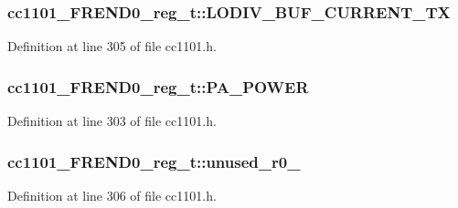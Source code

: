 \subsubsection[{\texorpdfstring{L\+O\+D\+I\+V\+\_\+\+B\+U\+F\+\_\+\+C\+U\+R\+R\+E\+N\+T\+\_\+\+TX}{LODIV_BUF_CURRENT_TX}}]{ cc1101\+\_\+\+F\+R\+E\+N\+D0\+\_\+reg\+\_\+t\+::\+L\+O\+D\+I\+V\+\_\+\+B\+U\+F\+\_\+\+C\+U\+R\+R\+E\+N\+T\+\_\+\+TX}\hypertarget{structcc1101___f_r_e_n_d0__reg__t_a6461f77120fbe314b6b185bc4e121732}{}\label{structcc1101___f_r_e_n_d0__reg__t_a6461f77120fbe314b6b185bc4e121732}


Definition at line 305 of file cc1101.\+h.

\subsubsection[{\texorpdfstring{P\+A\+\_\+\+P\+O\+W\+ER}{PA_POWER}}]{ cc1101\+\_\+\+F\+R\+E\+N\+D0\+\_\+reg\+\_\+t\+::\+P\+A\+\_\+\+P\+O\+W\+ER}\hypertarget{structcc1101___f_r_e_n_d0__reg__t_a4a9f4e44be3b5f16b8b7e80ff2c4c6ac}{}\label{structcc1101___f_r_e_n_d0__reg__t_a4a9f4e44be3b5f16b8b7e80ff2c4c6ac}


Definition at line 303 of file cc1101.\+h.

\subsubsection[{\texorpdfstring{unused\+\_\+r0\+\_\+1}{unused_r0_1}}]{ cc1101\+\_\+\+F\+R\+E\+N\+D0\+\_\+reg\+\_\+t\+::unused\+\_\+r0\+\_}\hypertarget{structcc1101___f_r_e_n_d0__reg__t_a743701e693d2aa4344c6f822f3932cd2}{}\label{structcc1101___f_r_e_n_d0__reg__t_a743701e693d2aa4344c6f822f3932cd2}


Definition at line 306 of file cc1101.\+h.

